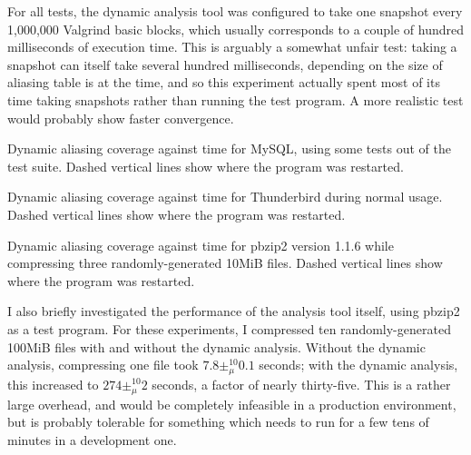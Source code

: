 For all tests, the dynamic analysis tool was configured to take one
snapshot every 1,000,000 Valgrind basic blocks, which usually
corresponds to a couple of hundred milliseconds of execution
time. This is arguably a somewhat unfair test: taking a snapshot can
itself take several hundred milliseconds, depending on the size of
aliasing table is at the time, and so this experiment actually spent
most of its time taking snapshots rather than running the test
program.  A more realistic test would probably show faster
convergence.

\begin{sanefig}
  \caption{Dynamic aliasing coverage against time for MySQL, using
    some tests out of the test suite.  Dashed vertical lines show where the
    program was restarted.}
  \label{fig:eval:dyn_convergence:mysqld}
\end{sanefig}

\begin{sanefig}
  \caption{Dynamic aliasing coverage against time for Thunderbird
    during normal usage.  Dashed vertical lines show where the program was
    restarted.}
  \label{fig:eval:dyn_convergence:thunderbird}
\end{sanefig}

\begin{sanefig}
  \caption{Dynamic aliasing coverage against time for pbzip2 version
    1.1.6 while compressing three randomly-generated 10MiB files.
    Dashed vertical lines show where the program was restarted.}
  \label{fig:eval:dyn_convergence:pbzip2}
\end{sanefig}

I also briefly investigated the performance of the analysis tool
itself, using pbzip2 as a test program.  For these experiments, I
compressed ten randomly-generated 100MiB files with and without the
dynamic analysis.  Without the dynamic analysis, compressing one file
took $7.8 \pm_\mu^{10} 0.1$ seconds; with the dynamic analysis, this
increased to $274 \pm_\mu^{10} 2$ seconds, a factor of nearly thirty-five.
This is a rather large overhead, and would be completely infeasible in
a production environment, but is probably tolerable for something
which needs to run for a few tens of minutes in a development one.


